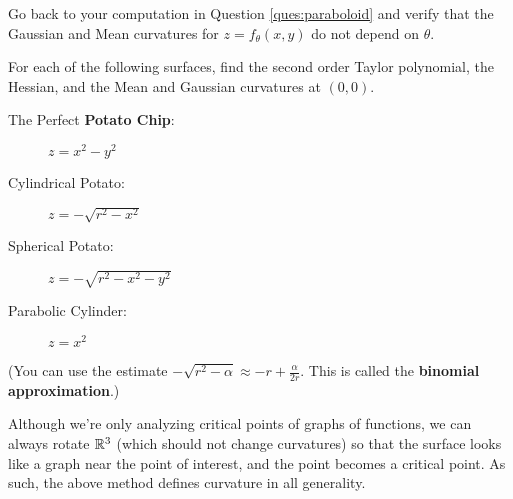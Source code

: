 \begin{ques}
  Go back to your computation in Question \ref{ques:paraboloid} and verify that the Gaussian and Mean curvatures for $z=f_\theta(x,y)$ do not depend on $\theta$.
\end{ques}

\begin{ques}
  For each of the following surfaces, find the second order Taylor polynomial, the Hessian, and the Mean and Gaussian curvatures at $(0,0)$.
  \begin{description}
    \item[The Perfect \textbf{Potato Chip}: ]  $ z = x^2 - y^2 $
    \item[Cylindrical Potato: ] $z = -\sqrt{r^2 - x^2} $
    \item[Spherical Potato: ] $z = -\sqrt{r^2 - x^2 - y^2}$
    \item[Parabolic Cylinder: ] $z =  x^2$
  \end{description}
  (You can use the estimate $-\sqrt{r^2 - \alpha} \approx -r + \frac{\alpha}{2r} $. This is called the \textbf{binomial approximation}.)
\end{ques}

\begin{remark}
  Although we're only analyzing critical points of graphs of functions, we can always rotate $ \mathbb{R}^3$ (which should not change curvatures) so that the surface looks like a graph near the point of interest, and the point becomes a critical point. As such, the above method defines curvature in all generality.
\end{remark}

